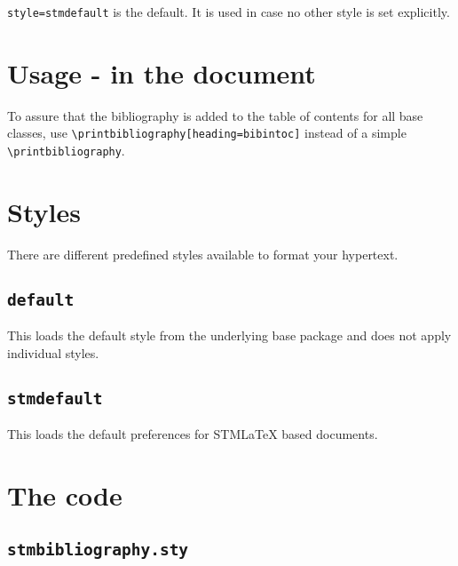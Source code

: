 \texttt{style=stmdefault} is the default. It is used in case no other style is set explicitly.

\section{Usage - in the document}

To assure that the bibliography is added to the table of contents for all base classes, use \verb+\printbibliography[heading=bibintoc]+ instead of a simple \verb+\printbibliography+.

\section{Styles}
\label{sec:styles}

There are different predefined styles available to format your hypertext.

\subsection{\protect\texttt{default}}
\label{sec:styles:default}

This loads the default style from the underlying base package and does not apply individual styles.

\subsection{\protect\texttt{stmdefault}}
\label{sec:styles:stmdefault}

This loads the default preferences for STM\LaTeX{} based documents.

\printbibliography[heading=bibintoc]

\printstmindex

\newpage
\appendix

\section{The code}
\label{sec:code}

\subsection{\protect\texttt{stmbibliography.sty}}
\label{sec:code:main}




